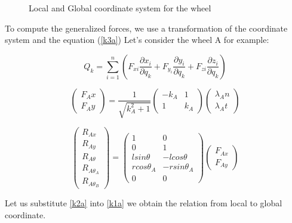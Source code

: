 \begin{figure}[htbp]
\begin{center}
 
\caption{Local and Global coordinate system for the wheel}
\label{figure:sdd}
\end{center}
\end{figure}

To compute the generalized forces, we use a transformation of the coordinate system and the equation (\eqref{k3a})
Let's consider the wheel A for example:

\begin{equation}
Q_{k}=\sum_{i=1}^n (F_{xi}\frac{\partial x_{i}}{\partial q_k}+F_{y_i}\frac{\partial y_{i}}{\partial q_k}+F_{zi}\frac{\partial z_{i}}{\partial q_k})
\label{k3a}
\end{equation}

\begin{equation}
\begin{pmatrix}
F_Ax\\F_Ay
\end{pmatrix}=
\frac{1}{\sqrt{k_A^2+1}}\begin{pmatrix}
-k_A & 1\\
1 & k_A \end{pmatrix}
\begin{pmatrix}
\lambda_An \\ \lambda_At
\label{k2a}
\end{pmatrix}
\end{equation}

\begin{equation}
\begin{pmatrix}
R_{Ax}\\ R_{Ay}\\ R_{A\theta} \\R_{A\theta_A}\\ R_{A\theta_B}
\end{pmatrix}=\begin{pmatrix}
1 & 0 \\
0 & 1 \\
lsin\theta & -lcos\theta \\
rcos\theta_A & -rsin\theta_A \\
0 & 0 \end{pmatrix}
\begin{pmatrix}
F_{Ax} \\ F_{Ay}
\label{k1a}
\end{pmatrix}
\end{equation}

Let us substitute \eqref{k2a} into \eqref{k1a}
we obtain the relation from local to global coordinate.

